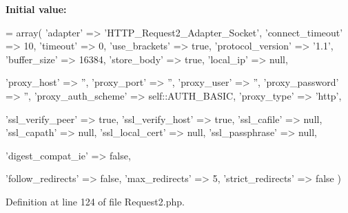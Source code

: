 {\bfseries Initial value\+:}
\begin{DoxyCode}
= array(
        \textcolor{stringliteral}{'adapter'}           => \textcolor{stringliteral}{'HTTP\_Request2\_Adapter\_Socket'},
        \textcolor{stringliteral}{'connect\_timeout'}   => 10,
        \textcolor{stringliteral}{'timeout'}           => 0,
        \textcolor{stringliteral}{'use\_brackets'}      => \textcolor{keyword}{true},
        \textcolor{stringliteral}{'protocol\_version'}  => \textcolor{stringliteral}{'1.1'},
        \textcolor{stringliteral}{'buffer\_size'}       => 16384,
        \textcolor{stringliteral}{'store\_body'}        => \textcolor{keyword}{true},
        \textcolor{stringliteral}{'local\_ip'}          => null,

        \textcolor{stringliteral}{'proxy\_host'}        => \textcolor{stringliteral}{''},
        \textcolor{stringliteral}{'proxy\_port'}        => \textcolor{stringliteral}{''},
        \textcolor{stringliteral}{'proxy\_user'}        => \textcolor{stringliteral}{''},
        \textcolor{stringliteral}{'proxy\_password'}    => \textcolor{stringliteral}{''},
        \textcolor{stringliteral}{'proxy\_auth\_scheme'} => self::AUTH\_BASIC,
        \textcolor{stringliteral}{'proxy\_type'}        => \textcolor{stringliteral}{'http'},

        \textcolor{stringliteral}{'ssl\_verify\_peer'}   => \textcolor{keyword}{true},
        \textcolor{stringliteral}{'ssl\_verify\_host'}   => \textcolor{keyword}{true},
        \textcolor{stringliteral}{'ssl\_cafile'}        => null,
        \textcolor{stringliteral}{'ssl\_capath'}        => null,
        \textcolor{stringliteral}{'ssl\_local\_cert'}    => null,
        \textcolor{stringliteral}{'ssl\_passphrase'}    => null,

        \textcolor{stringliteral}{'digest\_compat\_ie'}  => \textcolor{keyword}{false},

        \textcolor{stringliteral}{'follow\_redirects'}  => \textcolor{keyword}{false},
        \textcolor{stringliteral}{'max\_redirects'}     => 5,
        \textcolor{stringliteral}{'strict\_redirects'}  => \textcolor{keyword}{false}
    )
\end{DoxyCode}


Definition at line 124 of file Request2.\+php.

\hypertarget{classHTTP__Request2_a1a4f35074ef955bfe726e85b76ed17a9}{}\label{classHTTP__Request2_a1a4f35074ef955bfe726e85b76ed17a9} 
